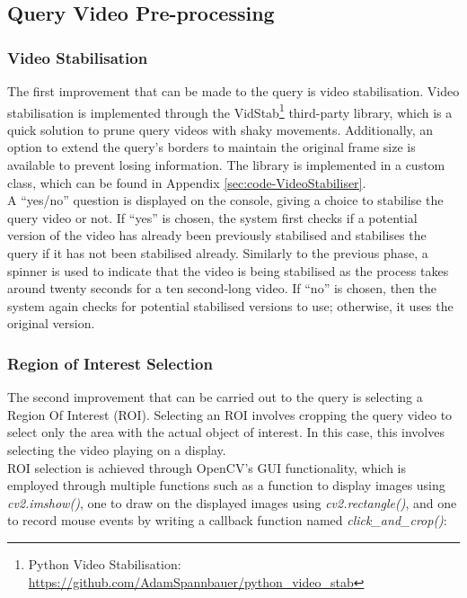 
\subsection{Query Video Pre-processing}

\subsubsection{Video Stabilisation}

The first improvement that can be made to the query is video stabilisation. Video stabilisation is implemented through the VidStab\footnote{Python Video Stabilisation: \url{https://github.com/AdamSpannbauer/python_video_stab}} third-party library, which is a quick solution to prune query videos with shaky movements. Additionally, an option to extend the query's borders to maintain the original frame size is available to prevent losing information. The library is implemented in a custom class, which can be found in Appendix \ref{sec:code-VideoStabiliser}.\\

A ``yes/no'' question is displayed on the console, giving a choice to stabilise the query video or not. If ``yes'' is chosen, the system first checks if a potential version of the video has already been previously stabilised and stabilises the query if it has not been stabilised already. Similarly to the previous phase, a spinner is used to indicate that the video is being stabilised as the process takes around twenty seconds for a ten second-long video. If ``no'' is chosen, then the system again checks for potential stabilised versions to use; otherwise, it uses the original version.

\subsubsection{Region of Interest Selection}

The second improvement that can be carried out to the query is selecting a Region Of Interest (ROI). Selecting an ROI involves cropping the query video to select only the area with the actual object of interest. In this case, this involves selecting the video playing on a display.\\

ROI selection is achieved through OpenCV's GUI functionality, which is employed through multiple functions such as a function to display images using \textit{cv2.imshow()}, one to draw on the displayed images using \textit{cv2.rectangle()}, and one to record mouse events by writing a callback function named \textit{click\_and\_crop()}:

